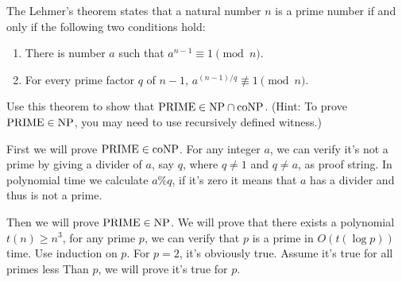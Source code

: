\documentclass{homework}
\begin{document}
\begin{problem}
  The Lehmer's theorem states that a natural number $n$ is a prime number if and
  only if the following two conditions hold:
  \begin{enumerate}
    \item There is number $a$ such that $a^{n-1} \equiv 1 \pmod{n}$.
    \item For every prime factor $q$ of $n-1$, $a^{(n-1)/q} \not\equiv 1 \pmod{n}$.
  \end{enumerate}
  Use this theorem to show that $\mathrm{PRIME} \in \textup{NP} \cap \textup{coNP}$.
  (Hint: To prove $\mathrm{PRIME} \in \textup{NP}$, you may need to use recursively defined
  witness.)
\end{problem}

\begin{solution}
  First we will prove $\mathrm{PRIME}\in\textup{coNP}$. For any integer $a$, we can verify it's not a prime by giving a divider of $a$, say $q$, where $q\neq 1$ and $q\neq a$, as proof string. In polynomial time we calculate $a\%q$, if it's zero it means that $a$ has a divider and thus is not a prime.

  Then we will prove $\mathrm{PRIME} \in\textup{NP}$. We will prove that there exists a polynomial $t(n)\ge n^3$, for any prime $p$, we can verify that $p$ is a prime in $O(t(\log p))$ time. Use induction on $p$. For $p=2$, it's obviously true. Assume it's true for all primes less Than $p$, we will prove it's true for $p$.


\end{solution}
\end{document}
